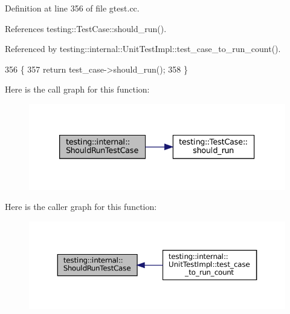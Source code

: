 Definition at line 356 of file gtest.\+cc.



References testing\+::\+Test\+Case\+::should\+\_\+run().



Referenced by testing\+::internal\+::\+Unit\+Test\+Impl\+::test\+\_\+case\+\_\+to\+\_\+run\+\_\+count().


\begin{DoxyCode}
356                                                          \{
357   \textcolor{keywordflow}{return} test\_case->should\_run();
358 \}
\end{DoxyCode}
Here is the call graph for this function\+:
\nopagebreak
\begin{figure}[H]
\begin{center}
\leavevmode
\includegraphics[width=333pt]{namespacetesting_1_1internal_a73e562dfef3eb7b30dfbb7b5e88e6df2_cgraph}
\end{center}
\end{figure}
Here is the caller graph for this function\+:
\nopagebreak
\begin{figure}[H]
\begin{center}
\leavevmode
\includegraphics[width=350pt]{namespacetesting_1_1internal_a73e562dfef3eb7b30dfbb7b5e88e6df2_icgraph}
\end{center}
\end{figure}
\mbox{\label{namespacetesting_1_1internal_a437bd89f5bc532778d7467600e210395}} 

